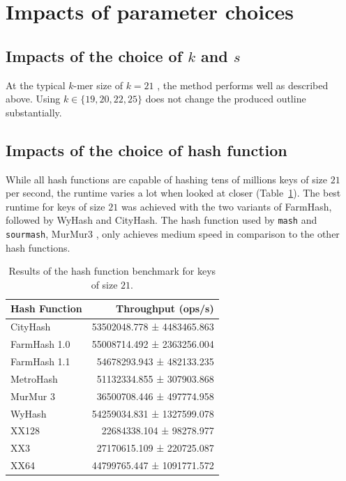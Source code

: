 \section{Impacts of parameter choices}
\subsection*{Impacts of the choice of $k$ and $s$}
At the typical $k$-mer size of $k=21$
\cite{mandalComparativeGenomeAnalysis2022,ondovMashFastGenome2016,irberLightweightCompositionalAnalysis2022},
the method performs well as described above. Using $k \in \{19, 20, 22, 25\}$
does not change the produced outline substantially. 

\subsection*{Impacts of the choice of hash function}
While all hash functions are capable of hashing tens of millions keys of size
$21$ per second, the runtime varies a lot when looked at closer
(Table~\ref{ta:hashbenchmark}). The best runtime for keys of size $21$ was
achieved with the two variants of FarmHash, followed by WyHash and CityHash. The
hash function used by \texttt{mash} and \texttt{sourmash}, MurMur3
\cite{ondovMashFastGenome2016,irberLightweightCompositionalAnalysis2022}, only
achieves medium speed in comparison to the other hash functions.  

\begin{table}[]
  \centering
  \begin{tabular}{@{}lr@{}}
  \toprule
  \textbf{Hash Function }& \textbf{Throughput (ops/s)}                      \\
  \midrule
  CityHash      & 53502048.778 ± 4483465.863   \\
  FarmHash 1.0  & 55008714.492 ± 2363256.004   \\
  FarmHash 1.1  & 54678293.943 ±  482133.235   \\
  MetroHash     & 51132334.855 ±  307903.868   \\
  MurMur 3      & 36500708.446 ±  497774.958   \\
  WyHash        & 54259034.831 ± 1327599.078   \\
  XX128         & 22684338.104 ±   98278.977   \\
  XX3           & 27170615.109 ±  220725.087   \\
  XX64          & 44799765.447 ± 1091771.572  \\
  \bottomrule
  \end{tabular}
  \caption{Results of the hash function benchmark for keys of size $21$.}
  \label{ta:hashbenchmark}
  \end{table}


